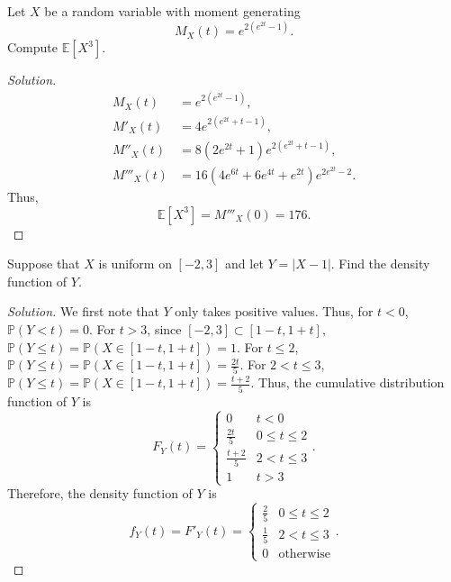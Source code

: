 \documentclass[addpoints, 11pt]{exam}
\newcommand*{\prob}{\mathds{P}}
\newcommand*{\E}{\mathds{E}}
\newenvironment{question}[1]{\smallskip\noindent\color{crimson}{\bf Question #1.}}{}
\begin{document}
\newpage

\begin{question}{6}
    Let $X$ be a random variable with moment generating 
    \[
        M_X(t) = e^{2(e^{2t} - 1)}.
    \]
    Compute $\E[X^3]$.
\end{question}

\begin{proof}[Solution]
    \begin{align*}
        M_X(t) &= e^{2(e^{2t} - 1)}, \\
        M'_X(t) &= 4e^{2(e^{2t} + t - 1)}, \\
        M''_X(t) &= 8(2e^{2t} + 1)e^{2(e^{2t} + t - 1)}, \\
        M'''_X(t) &= 16(4e^{6t} + 6e^{4t} + e^{2t})e^{2e^{2t} - 2}.
    \end{align*}
    Thus, 
    \[
        \E[X^3] =  M'''_X(0) = 176.
    \]
\end{proof}

\newpage

\begin{question}{7}
    Suppose that $X$ is uniform on $[-2, 3]$ and let $Y = |X - 1|$. Find the density function of $Y$.
\end{question}

\begin{proof}[Solution]
    We first note that $Y$ only takes positive values. Thus, for $t < 0$, $\prob(Y < t) = 0$. For $t > 3$, since $[-2, 3] \subset [1 - t, 1 + t]$, $\prob(Y \leq t) = \prob(X \in [1 - t, 1 + t]) = 1$. For $t \leq 2$, $\prob(Y \leq t) = \prob(X \in [1 - t, 1 + t]) = \frac{2t}{5}$. For $2 < t \leq 3$, $\prob(Y \leq t) = \prob(X \in [1 - t, 1 + t]) = \frac{t + 2}{5}$. Thus, the cumulative distribution function of $Y$ is 
    \[
        F_Y(t) = \begin{cases}
            0 & t < 0 \\
            \frac{2t}{5} & 0 \leq t \leq 2 \\
            \frac{t + 2}{5} & 2 < t \leq 3 \\
            1 & t > 3
        \end{cases}.
    \]
    Therefore, the density function of $Y$ is 
    \[
        f_Y(t) = F'_Y(t) = \begin{cases}
            \frac{2}{5} & 0 \leq t \leq 2 \\
            \frac{1}{5} & 2 < t \leq 3 \\ 
            0 & \text{otherwise}
        \end{cases}.
    \]
\end{proof}
\end{document}
